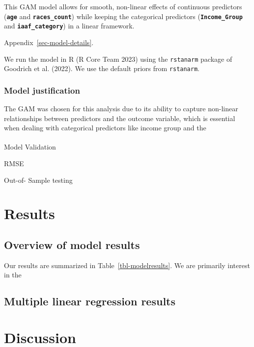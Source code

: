 \documentclass[
  letterpaper,
  DIV=11,
  numbers=noendperiod]{scrartcl}
\makeatletter
\let\oldparagraph\paragraph
\renewcommand{\paragraph}{
    \@ifstar
      \xxxParagraphStar
      \xxxParagraphNoStar
  }
\newcommand{\xxxParagraphStar}[1]{\oldparagraph*{#1}\mbox{}}
\newcommand{\xxxParagraphNoStar}[1]{\oldparagraph{#1}\mbox{}}
\makeatother
\begin{document}
This GAM model allows for smooth, non-linear effects of continuous
predictors (\textbf{\texttt{age}} and \textbf{\texttt{races\_count}})
while keeping the categorical predictors
(\textbf{\texttt{Income\_Group}} and \textbf{\texttt{iaaf\_category}})
in a linear framework.

Appendix~\ref{sec-model-details}.

We run the model in R (R Core Team 2023) using the \texttt{rstanarm}
package of Goodrich et al. (2022). We use the default priors from
\texttt{rstanarm}.

\subsubsection{Model justification}\label{model-justification}

The GAM was chosen for this analysis due to its ability to capture
non-linear relationships between predictors and the outcome variable,
which is essential when dealing with categorical predictors like income
group and the

\paragraph{Model Validation}\label{model-validation}

RMSE

Out-of- Sample testing

\section{Results}\label{results}

\subsection{Overview of model results}\label{overview-of-model-results}

Our results are summarized in Table~\ref{tbl-modelresults}. We are
primarily interest in the

\subsection{Multiple linear regression
results}\label{multiple-linear-regression-results}

\section{Discussion}\label{discussion}
\end{document}

